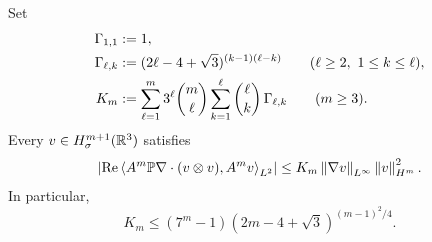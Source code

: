 \begin{lemma}
\label{f:lem:transport-commutator}
Set
\begin{align}
 \Gamma_{1,1}&:=1,\notag\\
 \Gamma_{\ell,k}
 &:=(2\ell-4+\sqrt3)^{(k-1)(\ell-k)}
 \qquad(\ell\ge2,\ 1\le k\le\ell),
 \label{f:eq:explicit-Gamma-lk}\\
 K_m&:=
 \sum_{\ell=1}^{m}3^\ell\binom m\ell
 \sum_{k=1}^{\ell}\binom\ell k\,\Gamma_{\ell,k}
 \qquad(m\ge3).
 \label{f:eq:explicit-commutator-constant}
\end{align}
Every \(v\in H^{m+1}_\sigma(\mathbb R^3)\) satisfies
\begin{equation}
 \left|\operatorname{Re}
 \left\langle A^m\mathbb P\nabla\cdot(v\otimes v),A^mv\right\rangle_{L^2}\right|
 \le K_m\left\lVert \nabla v\right\rVert_{L^\infty}\left\lVert v\right\rVert_{H^m}^2.
 \label{f:eq:transport-commutator}
\end{equation}
In particular,
\begin{equation}
 K_m\le(7^m-1)(2m-4+\sqrt3)^{(m-1)^2/4}.
 \label{f:eq:explicit-commutator-upper-bound}
\end{equation}
\end{lemma}

